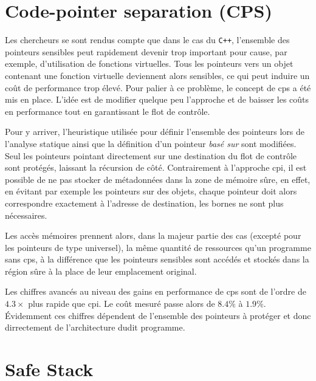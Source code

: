 \section{\og Code-pointer separation \fg (CPS)}

Les chercheurs se sont rendus compte que dans le cas du \texttt{C++}, l'ensemble des pointeurs sensibles peut rapidement devenir trop important pour cause, par exemple, d'utilisation de fonctions virtuelles. Tous les pointeurs vers un objet contenant une fonction virtuelle deviennent alors sensibles, ce qui peut induire un coût de performance trop élevé. Pour palier à ce problème, le concept de \og \gls{cps} \fg a été mis en place. L'idée est de modifier quelque peu l'approche et de baisser les coûts en performance tout en garantissant le flot de contrôle.

Pour y arriver, l'heuristique utilisée pour définir l'ensemble des pointeurs lors de l'analyse statique ainsi que la définition d'un pointeur \textit{basé sur} sont modifiées. Seul les pointeurs pointant directement sur une destination du flot de contrôle sont protégés, laissant la récursion de côté. Contrairement à l'approche \gls{cpi}, il est possible de ne pas stocker de métadonnées dans la zone de mémoire sûre, en effet, en évitant par exemple les pointeurs sur des objets, chaque pointeur doit alors correspondre exactement à l'adresse de destination, les bornes ne sont plus nécessaires.

Les accès mémoires prennent alors, dans la majeur partie des cas (excepté pour les pointeurs de type universel), la même quantité de ressources qu'un programme sans \gls{cps}, à la différence que les pointeurs sensibles sont accédés et stockés dans la région sûre à la place de leur emplacement original.

\newpage

Les chiffres avancés au niveau des gains en performance de \gls{cps} sont de l'ordre de $4.3\times$ plus rapide que \gls{cpi}. Le coût mesuré passe alors de $8.4\%$ à $1.9\%$. Évidemment ces chiffres dépendent de l'ensemble des pointeurs à protéger et donc dirrectement de l'architecture dudit programme.


\section{\og Safe Stack \fg}
\label{section:safeStack}

